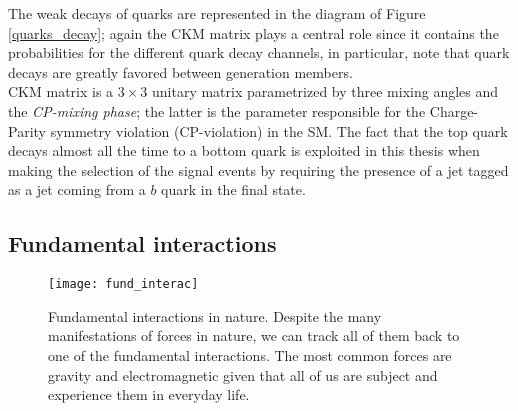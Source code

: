 The weak decays of quarks are represented in the diagram of Figure \ref{quarks_decay}; again the CKM matrix plays a central role since it contains the probabilities for the different quark decay channels, in particular, note that quark decays are greatly favored between generation members.\\

CKM matrix is a $3\times3$ unitary matrix parametrized by three mixing angles and the \textit{CP-mixing phase}; the latter is the parameter responsible for the Charge-Parity symmetry violation (CP-violation) in the SM. The fact that the top quark decays almost all the time to a bottom quark is exploited in this thesis when making the selection of the signal events by requiring the presence of a jet tagged as a jet coming from a $b$ quark in the final state.%

\subsection{Fundamental interactions}\label{fund_inter}

\begin{figure}[h!]
  \centering
  \texttt{[image: fund\_interac]}
  \caption[Fundamental interactions in nature.]{Fundamental interactions in nature. Despite the many manifestations of forces in nature, we can track all of them back to one of the fundamental interactions. The most common forces are gravity and electromagnetic given that all of us are subject and experience them in everyday life.}
  \label{fund_interac}
\end{figure}


